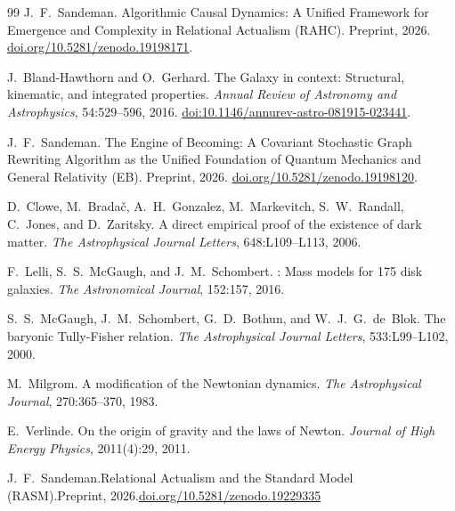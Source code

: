 \documentclass[11pt,a4paper]{article}
\theoremstyle{plain}
\theoremstyle{definition}
\theoremstyle{remark}
\begin{document}
\begin{thebibliography}{99}
J.~F.~Sandeman.
\newblock Algorithmic Causal Dynamics: A Unified Framework for Emergence and
  Complexity in Relational Actualism ({RAHC}).
\newblock Preprint, 2026.
\newblock \href{https://doi.org/10.5281/zenodo.19198171}{doi.org/10.5281/zenodo.19198171}.

J.~Bland-Hawthorn and O.~Gerhard.
\newblock The Galaxy in context: Structural, kinematic, and integrated
  properties.
\newblock \emph{Annual Review of Astronomy and Astrophysics}, 54:529--596, 2016.
\newblock \href{https://doi.org/10.1146/annurev-astro-081915-023441}{doi:10.1146/annurev-astro-081915-023441}.

J.~F.~Sandeman.
\newblock The Engine of Becoming: A Covariant Stochastic Graph Rewriting
  Algorithm as the Unified Foundation of Quantum Mechanics and General
  Relativity ({EB}).
\newblock Preprint, 2026.
\newblock \href{https://doi.org/10.5281/zenodo.19198120}{doi.org/10.5281/zenodo.19198120}.

D.~Clowe, M.~Brada\v{c}, A.~H.~Gonzalez, M.~Markevitch, S.~W.~Randall,
C.~Jones, and D.~Zaritsky.
\newblock A direct empirical proof of the existence of dark matter.
\newblock \textit{The Astrophysical Journal Letters}, 648:L109--L113, 2006.

F.~Lelli, S.~S.~McGaugh, and J.~M.~Schombert.
: Mass models for 175 disk galaxies.
\newblock \textit{The Astronomical Journal}, 152:157, 2016.

S.~S.~McGaugh, J.~M.~Schombert, G.~D.~Bothun, and W.~J.~G.~de~Blok.
\newblock The baryonic Tully-Fisher relation.
\newblock \textit{The Astrophysical Journal Letters}, 533:L99--L102, 2000.

M.~Milgrom.
\newblock A modification of the Newtonian dynamics.
\newblock \textit{The Astrophysical Journal}, 270:365--370, 1983.

E.~Verlinde.
\newblock On the origin of gravity and the laws of Newton.
\newblock \textit{Journal of High Energy Physics}, 2011(4):29, 2011.

J.~F.~Sandeman.\newblock Relational Actualism and the Standard Model ({RASM}).\newblock Preprint, 2026.\newblock \href{https://doi.org/10.5281/zenodo.19229335}{doi.org/10.5281/zenodo.19229335}


\end{thebibliography}
\end{document}

